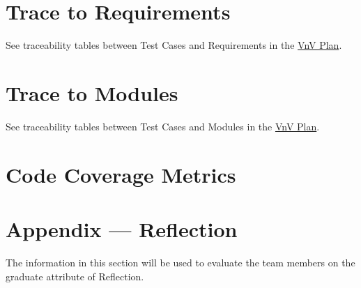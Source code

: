 \documentclass[12pt, titlepage]{article}
\begin{document}
\section{Trace to Requirements}
See traceability tables between Test Cases and Requirements in the \href{https://github.com/emilyperica/ScoreGen/blob/main/docs/VnVPlan/VnVPlan.pdf}{VnV Plan}.
		
\section{Trace to Modules}		
See traceability tables between Test Cases and Modules in the \href{https://github.com/emilyperica/ScoreGen/blob/main/docs/VnVPlan/VnVPlan.pdf}{VnV Plan}.

\section{Code Coverage Metrics}




\newpage{}
\section*{Appendix --- Reflection}

The information in this section will be used to evaluate the team members on the
graduate attribute of Reflection.


\end{document}
